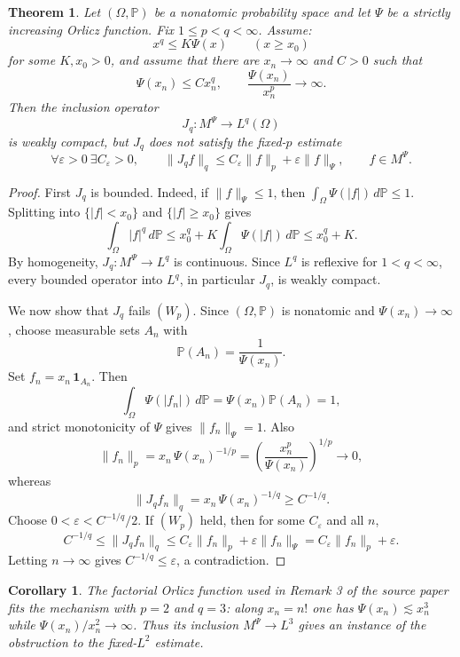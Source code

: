 \documentclass[11pt]{article}
\newtheorem*{theorem}{Theorem}
\newtheorem*{corollary}{Corollary}
\newcommand{\eps}{\varepsilon}
\begin{document}
\begin{theorem}
Let \((\Omega,\mathbb P)\) be a nonatomic probability space and let \(\Psi\) be
a strictly increasing Orlicz function. Fix \(1\le p<q<\infty\). Assume:
\[
  x^q\le K\Psi(x)\qquad (x\ge x_0)
\]
for some \(K,x_0>0\), and assume that there are \(x_n\to\infty\) and \(C>0\)
such that
\[
  \Psi(x_n)\le Cx_n^q,
  \qquad
  \frac{\Psi(x_n)}{x_n^p}\longrightarrow\infty.
\]
Then the inclusion operator
\[
  J_q:M^\Psi\longrightarrow L^q(\Omega)
\]
is weakly compact, but \(J_q\) does not satisfy the fixed-\(p\) estimate
\[
  \forall \eps>0\ \exists C_\eps>0,\qquad
  \|J_q f\|_q\le C_\eps\|f\|_p+\eps\|f\|_\Psi,\qquad f\in M^\Psi. \tag{\(W_p\)}
\]
\end{theorem}

\begin{proof}
First \(J_q\) is bounded. Indeed, if \(\|f\|_\Psi\le1\), then
\(\int_\Omega\Psi(|f|)\,d\mathbb P\le1\). Splitting into
\(\{|f|<x_0\}\) and \(\{|f|\ge x_0\}\) gives
\[
  \int_\Omega |f|^q\,d\mathbb P
  \le x_0^q+K\int_\Omega\Psi(|f|)\,d\mathbb P
  \le x_0^q+K.
\]
By homogeneity, \(J_q:M^\Psi\to L^q\) is continuous. Since \(L^q\) is reflexive
for \(1<q<\infty\), every bounded operator into \(L^q\), in particular \(J_q\),
is weakly compact.

We now show that \(J_q\) fails \((W_p)\). Since \((\Omega,\mathbb P)\) is
nonatomic and \(\Psi(x_n)\to\infty\), choose measurable sets \(A_n\) with
\[
  \mathbb P(A_n)=\frac{1}{\Psi(x_n)}.
\]
Set \(f_n=x_n\,\mathbf 1_{A_n}\). Then
\[
  \int_\Omega \Psi(|f_n|)\,d\mathbb P
  =\Psi(x_n)\mathbb P(A_n)=1,
\]
and strict monotonicity of \(\Psi\) gives \(\|f_n\|_\Psi=1\). Also
\[
  \|f_n\|_p
  =
  x_n\,\Psi(x_n)^{-1/p}
  =
  \left(\frac{x_n^p}{\Psi(x_n)}\right)^{1/p}
  \longrightarrow0,
\]
whereas
\[
  \|J_q f_n\|_q
  =
  x_n\,\Psi(x_n)^{-1/q}
  \ge C^{-1/q}.
\]
Choose \(0<\eps<C^{-1/q}/2\). If \((W_p)\) held, then for some \(C_\eps\) and
all \(n\),
\[
  C^{-1/q}
  \le
  \|J_q f_n\|_q
  \le
  C_\eps\|f_n\|_p+\eps\|f_n\|_\Psi
  =
  C_\eps\|f_n\|_p+\eps.
\]
Letting \(n\to\infty\) gives \(C^{-1/q}\le\eps\), a contradiction.
\end{proof}

\begin{corollary}
The factorial Orlicz function used in Remark 3 of the source paper fits the
mechanism with \(p=2\) and \(q=3\): along \(x_n=n!\) one has
\(\Psi(x_n)\lesssim x_n^3\) while \(\Psi(x_n)/x_n^2\to\infty\). Thus its
inclusion \(M^\Psi\to L^3\) gives an instance of the obstruction to the
fixed-\(L^2\) estimate.
\end{corollary}
\end{document}
